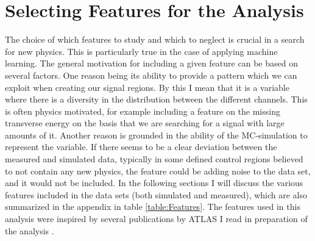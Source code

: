 \section{Selecting Features for the Analysis}\label{sec:Feats}
The choice of which features to study and which to neglect is crucial in a search for new physics. This is particularly true 
in the case of applying machine learning. The general motivation for including a given feature can be based on several factors. 
One reason being its ability to provide a pattern which we can exploit when creating our signal regions. By this I mean
that it is a variable where there is a diversity in the distribution between the different channels. This is often physics motivated, for example 
including a feature on the missing transverse energy on the basis that we are searching for a signal with large amounts of it. 
Another reason is grounded in the ability of the \ac{MC}-simulation to represent the variable. If there seems to be a clear deviation between the 
measured and simulated data, typically in some defined control regions believed to not contain any new physics, the feature could be adding noise 
to the data set, and it would not be included. In the following sections I will discuss the various features included in the data sets (both simulated and measured), 
which are also summarized in the appendix in table \ref{table:Features}. The features used in this analysis were inspired by several publications by \ac{ATLAS} I read in 
preparation of the analysis \cite{franchini_search_2019, atlas_search_2021}.